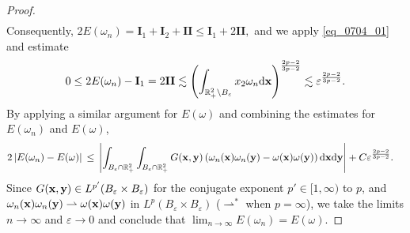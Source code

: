 \documentclass[11pt]{amsart}
\theoremstyle{definition}
\theoremstyle{definition}
\numberwithin{equation}{section}
\newcommand{\0}{\emptyset}
\newcommand{\bfx}{{\bf x}}
\newcommand{\bfy}{{\bf y}}
\newcommand{\varep}{\varepsilon}
\newcommand{\dd}{\mathrm{d}}
\begin{document}
\begin{proof}
\begin{align*}
				\end{align*}
				Consequently, $2E(\omega_n) = \mathbf{I}_{1} + \mathbf{I}_{2} + \mathbf{II} \le \mathbf{I}_1 + 2\mathbf{II},$
				and we apply \eqref{eq_0704_01} and estimate
				\begin{align*}
					0\le 2E(\omega_n) - \mathbf{I}_{1}
					=  2\mathbf{II} \lesssim   
					\left(\int_{\mathbb{R}^{2}_{+} \setminus B_{\varep}}x_2\omega_n  \dd \bfx\right)^{\frac{2p-2}{3p-2}}\lesssim  \varepsilon^{\frac{2p-2}{3p-2}}.
				\end{align*}
				By applying a similar argument for $E(\omega)$ and combining the estimates for $E(\omega_n)$ and $E(\omega)$,
				\begin{align*}
					2\left| E(\omega_n) - E(\omega) \right| \, &\leq \, \left|\int_{B_{\varepsilon} \cap \mathbb{R}^{2}_{+}} \int_{B_{\varepsilon} \cap \mathbb{R}^{2}_{+}} G(\bfx, \bfy) \left(\omega_n(\bfx)\omega_n(\bfy) - \omega(\bfx)\omega(\bfy)\right)   \dd \bfx \dd \bfy \right| +  C\varepsilon^{\frac{2p-2}{3p-2}}.
				\end{align*}
				Since $G(\bfx,\bfy) \in L^{p'}(B_{\varep} \times B_{\varep})$ for the conjugate exponent $p' \in [1, \infty)$ to $p$, and $\omega_n(\bfx)\omega_n(\bfy) \rightharpoonup \omega(\bfx)\omega(\bfy)$ in $L^{p}(B_{\varep} \times B_{\varep})$ ($\rightharpoonup^*$ when $p = \infty$), we take the limits $n \to \infty$ and $\varepsilon \to 0$ and conclude that $\lim_{n\to \infty}E(\omega_n)
				=  E(\omega)$.
				

\end{proof}
\end{document}
